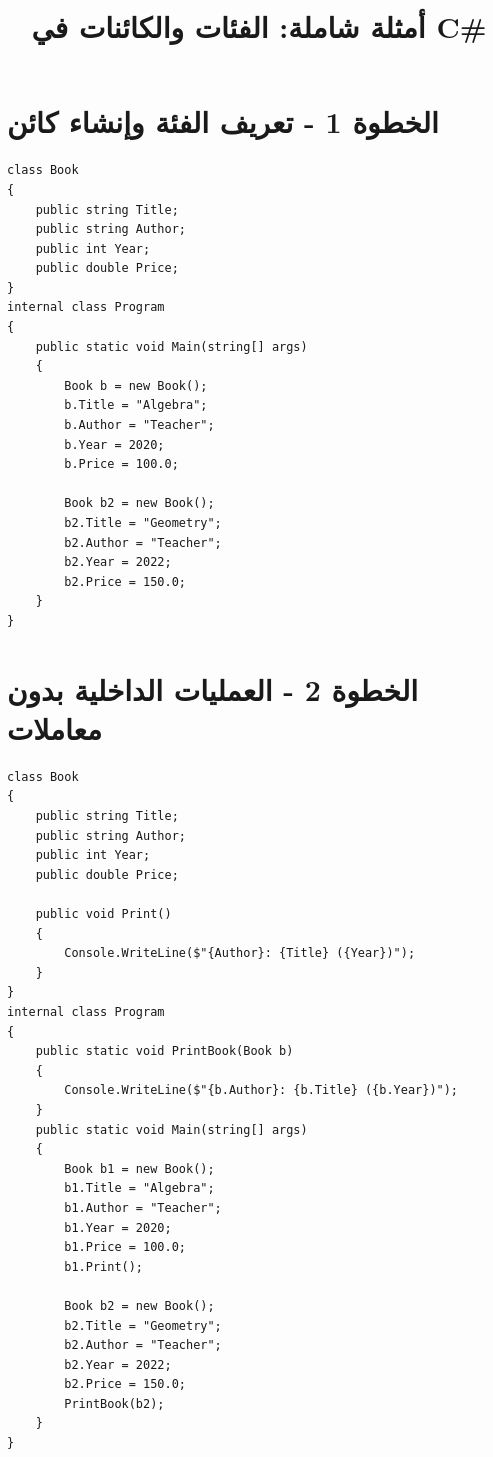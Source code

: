 \documentclass[11pt]{article}
\title{أمثلة شاملة: الفئات والكائنات في \textenglish{C\#}}
\begin{document}
\maketitle
\thispagestyle{fancy}

\section*{الخطوة 1 - تعريف الفئة وإنشاء كائن}
\begin{boxExample}
\begin{english}
\begin{verbatim}
class Book
{
    public string Title;
    public string Author;
    public int Year;
    public double Price;
}
internal class Program
{
    public static void Main(string[] args)
    {
        Book b = new Book();
        b.Title = "Algebra";
        b.Author = "Teacher";
        b.Year = 2020;
        b.Price = 100.0;

        Book b2 = new Book();
        b2.Title = "Geometry";
        b2.Author = "Teacher";
        b2.Year = 2022;
        b2.Price = 150.0;
    }
}
\end{verbatim}
\end{english}
\end{boxExample}

\clearpage
\section*{الخطوة 2 - العمليات الداخلية بدون معاملات}
\begin{boxExample}
\begin{english}
\begin{verbatim}
class Book
{
    public string Title;
    public string Author;
    public int Year;
    public double Price;

    public void Print()
    {
        Console.WriteLine($"{Author}: {Title} ({Year})");
    }
}
internal class Program
{
    public static void PrintBook(Book b)
    {
        Console.WriteLine($"{b.Author}: {b.Title} ({b.Year})");
    }
    public static void Main(string[] args)
    {
        Book b1 = new Book();
        b1.Title = "Algebra";
        b1.Author = "Teacher";
        b1.Year = 2020;
        b1.Price = 100.0;
        b1.Print();

        Book b2 = new Book();
        b2.Title = "Geometry";
        b2.Author = "Teacher";
        b2.Year = 2022;
        b2.Price = 150.0;
        PrintBook(b2);
    }
}
\end{verbatim}
\end{english}
\end{boxExample}
\end{document}
